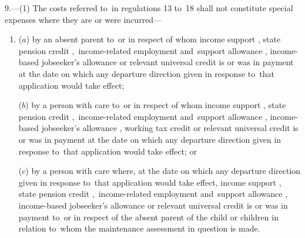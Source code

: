 \documentclass[12pt,a4paper]{article}
\begin{document}
9.—(1) The costs referred to~in regulations 13 to~18 shall not constitute special expenses where they are or were incurred—
\begin{enumerate}\item[]
($a$) by an absent parent to~or in respect of whom income support%
, state pension credit%
,~income-related employment and~support allowance%
, income-based jobseeker’s allowance or relevant universal credit  %
is or was in payment at the date on which any departure direction given in response to~that application would take effect;

($b$) by a person with care to~or in respect of whom income support%
, state pension credit%
,~income-related employment and~support allowance%
, income-based jobseeker’s allowance%
, working tax credit or relevant universal credit  %
is or was in payment at the date on which any departure direction given in response to~that application would take effect; or

($c$) by a person with care where, at the date on which any departure direction given in response to~that application would take effect, income support%
, state pension credit%
,~income-related employment and~support allowance%
, income-based jobseeker’s allowance or relevant universal credit  %
is or was in payment to~or in respect of the absent parent of the child or children in relation to~whom the maintenance assessment in question is made.
\end{enumerate}
\end{document}
